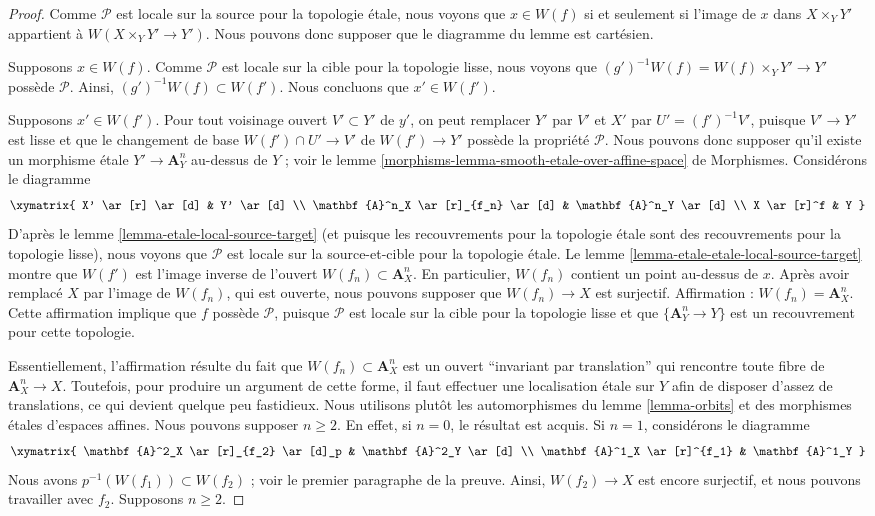 \begin{proof}
Comme $\mathcal{P}$ est locale sur la source pour la topologie \'etale, nous
voyons que $x \in W(f)$ si et seulement si l'image de $x$ dans
$X \times_Y Y'$ appartient à $W(X \times_Y Y' \to Y')$. Nous pouvons donc
supposer que le diagramme du lemme est cartésien.

\medskip\noindent
Supposons $x \in W(f)$. Comme $\mathcal{P}$ est locale sur la cible pour la
topologie lisse, nous voyons que
$(g')^{-1}W(f) = W(f) \times_Y Y' \to Y'$ possède
$\mathcal{P}$. Ainsi, $(g')^{-1}W(f) \subset W(f')$. Nous concluons que
$x' \in W(f')$.

\medskip\noindent
Supposons $x' \in W(f')$. Pour tout voisinage ouvert $V' \subset Y'$ de $y'$,
on peut remplacer $Y'$ par $V'$ et $X'$ par $U' = (f')^{-1}V'$, puisque
$V' \to Y'$ est lisse et que le changement de base
$W(f') \cap U' \to V'$ de $W(f') \to Y'$ possède la propriété $\mathcal{P}$.
Nous pouvons donc supposer qu'il existe un morphisme \'etale
$Y' \to \mathbf{A}^n_Y$ au-dessus de $Y$ ; voir le
lemme \ref{morphisms-lemma-smooth-etale-over-affine-space} de Morphismes.
Considérons le diagramme
$$
\xymatrix{
X' \ar[r] \ar[d] & Y' \ar[d] \\
\mathbf{A}^n_X \ar[r]_{f_n} \ar[d] & \mathbf{A}^n_Y \ar[d] \\
X \ar[r]^f & Y
}
$$
D'après le lemme \ref{lemma-etale-local-source-target} (et puisque les
recouvrements pour la topologie \'etale sont des recouvrements pour la
topologie lisse), nous voyons que $\mathcal{P}$ est locale sur la source-et-cible pour la topologie \'etale. Le
lemme \ref{lemma-etale-etale-local-source-target} montre que
$W(f')$ est l'image inverse de l'ouvert $W(f_n) \subset \mathbf{A}^n_X$. En
particulier, $W(f_n)$ contient un point au-dessus de $x$. Après avoir remplacé
$X$ par l'image de $W(f_n)$, qui est ouverte, nous pouvons supposer que
$W(f_n) \to X$ est surjectif. Affirmation :
$W(f_n) = \mathbf{A}^n_X$. Cette affirmation implique que $f$ possède
$\mathcal{P}$, puisque $\mathcal{P}$ est locale sur la cible pour la topologie
lisse et que $\{\mathbf{A}^n_Y \to Y\}$ est un recouvrement pour cette
topologie.

\medskip\noindent
Essentiellement, l'affirmation résulte du fait que
$W(f_n) \subset \mathbf{A}^n_X$ est un ouvert ``invariant par translation''
qui rencontre toute fibre de $\mathbf{A}^n_X \to X$. Toutefois, pour produire
un argument de cette forme, il faut effectuer une localisation \'etale sur
$Y$ afin de disposer d'assez de translations, ce qui devient quelque peu
fastidieux. Nous utilisons plutôt les automorphismes du
lemme \ref{lemma-orbits} et des morphismes étales d'espaces affines.
Nous pouvons supposer $n \geq 2$. En effet, si $n = 0$, le résultat est acquis.
Si $n = 1$, considérons le diagramme
$$
\xymatrix{
\mathbf{A}^2_X \ar[r]_{f_2} \ar[d]_p & \mathbf{A}^2_Y \ar[d] \\
\mathbf{A}^1_X \ar[r]^{f_1} & \mathbf{A}^1_Y
}
$$
Nous avons $p^{-1}(W(f_1)) \subset W(f_2)$ ; voir le premier paragraphe de la
preuve. Ainsi, $W(f_2) \to X$ est encore surjectif, et nous pouvons travailler
avec $f_2$. Supposons $n \geq 2$.


\end{proof}
